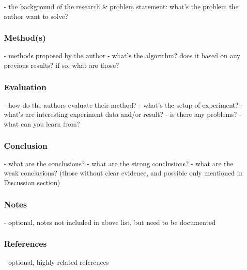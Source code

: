 \documentclass[lang=en,mode=normal,device=normal,color=blue,12pt]{elegantnote}
\DeclareMathOperator*{\1}{\mathbbm{1}}
\begin{document}
\begin{appendices}
- the background of the research \& problem statement: what's the problem the author want to solve?

\subsubsection{Method(s)}

- methods proposed by the author
- what's the algorithm? does it based on any previous results? if so, what are those?

\subsubsection{Evaluation}

- how do the authors evaluate their method?
- what's the setup of experiment?
- what's are interesting experiment data and/or result?
- is there any problems?
- what can you learn from?

\subsubsection{Conclusion}

- what are the conclusions?
- what are the strong conclusions?
- what are the weak conclusions? (those without clear evidence, and possible only mentioned in Discussion section)

\subsubsection{Notes}

- optional, notes not included in above list, but need to be documented

\subsubsection{References}
- optional, highly-related references



\end{appendices}



\newpage

\end{document}
